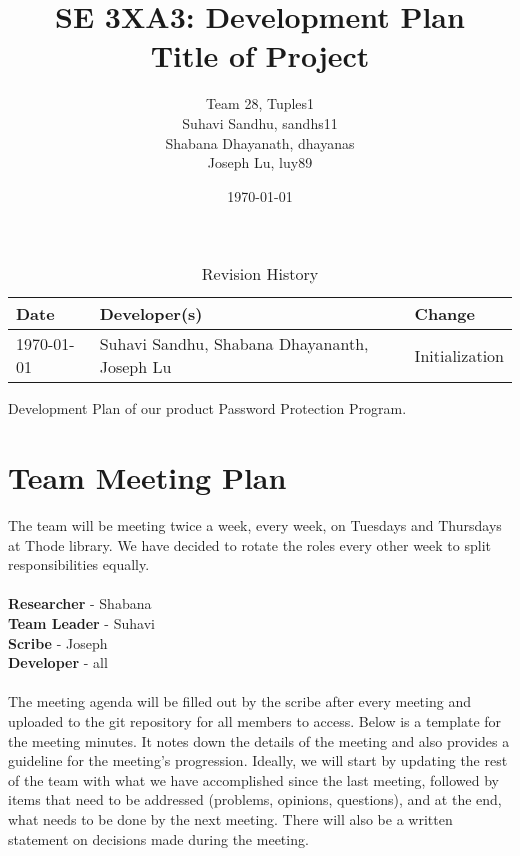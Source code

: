\documentclass{article}
\title{SE 3XA3: Development Plan\\Title of Project}
\author{Team 28, Tuples1
		\\ Suhavi Sandhu, sandhs11
		\\ Shabana Dhayanath, dhayanas
		\\ Joseph Lu, luy89
}
\date{\today}
\begin{document}
\begin{table}[hp]
\caption{Revision History} \label{TblRevisionHistory}
\begin{tabularx}{\textwidth}{llX}
\toprule
\textbf{Date} & \textbf{Developer(s)} & \textbf{Change}\\
\midrule
\today & Suhavi Sandhu, Shabana Dhayananth, Joseph Lu & Initialization\\
\bottomrule
\end{tabularx}
\end{table}

\newpage

\maketitle

Development Plan of our product Password Protection Program.

\section{Team Meeting Plan}
The team will be meeting twice a week, every week, on Tuesdays and Thursdays at Thode library. We have decided to rotate the roles every other week to split responsibilities equally.\\\\
\textbf{Researcher} - Shabana\\
\textbf{Team Leader} - Suhavi\\
\textbf{Scribe} - Joseph\\
\textbf{Developer} - all\\\\
The meeting agenda will be filled out by the scribe after every meeting and uploaded to the git repository for all members to access. Below is a template for the meeting minutes. It notes down the details of the meeting and also provides a guideline for the meeting’s progression. Ideally, we will start by updating the rest of the team with what we have accomplished since the last meeting, followed by items that need to be addressed (problems, opinions, questions), and at the end, what needs to be done by the next meeting. There will also be a written statement on decisions made during the meeting.
\end{document}

